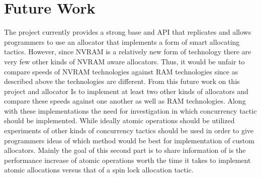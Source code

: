 \documentclass[conference]{IEEEtran}
\begin{document}
\section{Future Work}
The project currently provides a strong base and API that replicates and allows programmers to use an allocator that implements a form of smart allocating tactics. However, since NVRAM is a relatively new form of technology there are very few other kinds of NVRAM aware allocators. Thus, it would be unfair to compare speeds of NVRAM technologies against RAM technologies since as described above the technologies are different. From this future work on this project and allocator Is to implement at least two other kinds of allocators and compare these speeds against one another as well as RAM technologies. Along with these implementations the need for investigation in which concurrency tactic should be implemented. While ideally atomic operations should be utilized experiments of other kinds of concurrency tactics should be used in order to give programmers ideas of which method would be best for implementation of custom allocators. Mainly the goal of this second part is to share information of is the performance increase of atomic operations worth the time it takes to implement atomic allocations versus that of a spin lock allocation tactic. 
\end{document}
